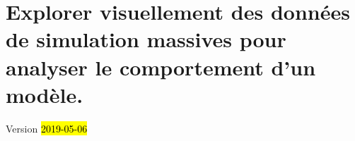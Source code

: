 \chapter{Explorer visuellement des données de simulation massives pour analyser le comportement d'un modèle.}
\label{chap:chap5}
\begin{center}
{\large Version \hl{2019-05-06}}

\end{center}
\minitoc

%

%

\setcounter{section}{1}


%

%

%



\printbibliography[title={Références}]
